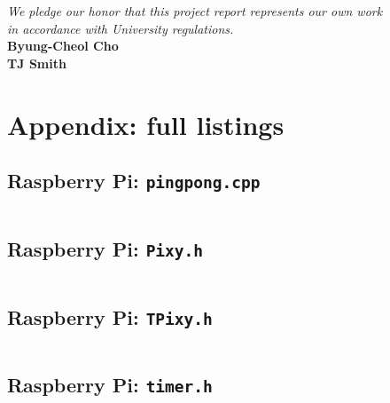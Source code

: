 \documentclass[letterpaper, 11pt]{article}
\begin{document}
\begin{enumerate}[label=\textbf{\arabic*.}]
\vfill
\begin{flushright}
    \textit{We pledge our honor that this project report represents our own work \\ in accordance with University regulations.} \\
    \textbf{Byung-Cheol Cho} \\
    \textbf{TJ Smith}
\end{flushright}

\clearpage
\section{Appendix: full listings}
\cftsubsubsecindent 0pt
\localtableofcontents

\subsection{Raspberry Pi: \texttt{pingpong.cpp}}
\begin{mdframed}[backgroundcolor=bg]
    \inputminted[breaklines]{cpp}{files/rpi/pingpong.cpp}
\end{mdframed}

\subsection{Raspberry Pi: \texttt{Pixy.h}}
\begin{mdframed}[backgroundcolor=bg]
    \inputminted[breaklines]{cpp}{files/rpi/Pixy.h}
\end{mdframed}

\subsection{Raspberry Pi: \texttt{TPixy.h}}
\begin{mdframed}[backgroundcolor=bg]
    \inputminted[breaklines]{cpp}{files/rpi/TPixy.h}
\end{mdframed}

\subsection{Raspberry Pi: \texttt{timer.h}}
\begin{mdframed}[backgroundcolor=bg]
    \inputminted[breaklines]{cpp}{files/rpi/timer.h}
\end{mdframed}


\end{enumerate}
\end{document}
